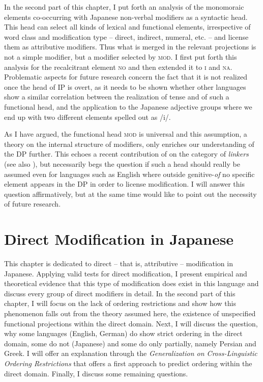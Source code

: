 \documentclass [output=book,colorlinks,citecolor=brown]{langscibook}
\begin{document}
In the second part of this chapter, I put forth an analysis of the monomoraic elements co-occurring with Japanese non-verbal modifiers as a syntactic head. This head can select all kinds of lexical and functional elements, irrespective of word class and modification type -- direct, indirect, numeral, etc. -- and license them as attributive modifiers. Thus what is merged in the relevant projections is not a simple modifier, but a modifier selected by \textsc{mod}. I first put forth this analysis for the recalcitrant element \textsc{no} and then extended it to \textsc{i} and \textsc{na}. Problematic aspects for future research concern the fact that it is not realized once the head of IP is overt, as it needs to be shown whether other languages show a similar correlation between the realization of tense and of such a functional head, and the application to the Japanese adjective groups where we end up with two different elements spelled out as /i/.

As I have argued, the functional head \textsc{mod} is universal and this assumption, a theory on the internal structure of modifiers, only enriches our understanding of the DP further. This echoes a recent contribution of \citet{richards:2023:finding} on the category of \textit{linkers} (see also \citealt{richards:1997:comp, baker:2006:linkers, richards:2010:uttering}), but necessarily begs the question if such a head should really be assumed even for languages such as English where outside genitive-\textit{of} no specific element appears in the DP in order to license modification. I will answer this question affirmatively, but at the same time would like to point out the necessity of future research.

\chapter{Direct Modification in Japanese} \label{direct japanese}

This chapter is dedicated to direct -- that is, attributive -- modification in Japanese. Applying valid tests for direct modification, I present empirical and theoretical evidence that this type of modification does exist in this language and discuss every group of direct modifiers in detail. In the second part of this chapter, I will focus on the lack of ordering restrictions and show how this phenomenon falls out from the theory assumed here, the existence of unspecified functional projections within the direct domain. Next, I will discuss the question, why some languages (English, German) do show strict ordering in the direct domain, some do not (Japanese) and some do only partially, namely Persian and Greek. I will offer an explanation through the \textit{Generalization on Cross-Linguistic Ordering Restrictions} that offers a first approach to predict ordering within the direct domain. Finally, I discuss some remaining questions.
\end{document}
